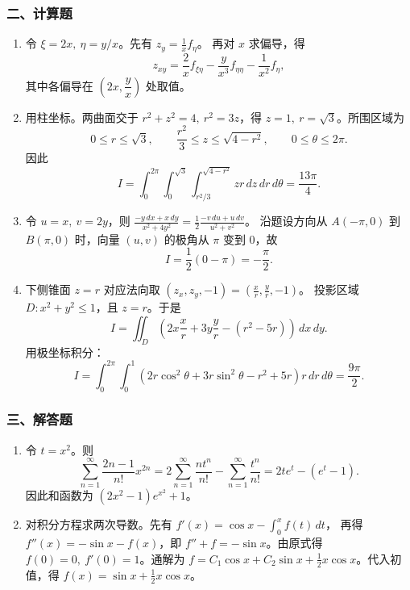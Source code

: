 \subsubsection*{二、计算题}
\begin{enumerate}
  \item 令 $\xi=2x,\ \eta=y/x$。先有 \(\displaystyle z_y=\frac1x f_\eta\)。
  再对 $x$ 求偏导，得
  \[
  z_{xy}=\frac2x f_{\xi\eta}-\frac{y}{x^3}f_{\eta\eta}-\frac1{x^2}f_\eta,
  \]
  其中各偏导在 $\left(2x,\dfrac{y}{x}\right)$ 处取值。
  \item 用柱坐标。两曲面交于 $r^2+z^2=4,\ r^2=3z$，得 $z=1,\ r=\sqrt3$。所围区域为
  \[
  0\le r\le\sqrt3,\qquad \frac{r^2}{3}\le z\le\sqrt{4-r^2},\qquad 0\le\theta\le2\pi .
  \]
  因此
  \[
  I=\int_0^{2\pi}\int_0^{\sqrt3}\int_{r^2/3}^{\sqrt{4-r^2}}z r\,dz\,dr\,d\theta
  =\frac{13\pi}{4}.
  \]
  \item 令 $u=x,\ v=2y$，则 \(\displaystyle \frac{-y\,dx+x\,dy}{x^2+4y^2}=\frac12\frac{-v\,du+u\,dv}{u^2+v^2}\)。
  沿题设方向从 $A(-\pi,0)$ 到 $B(\pi,0)$ 时，向量 $(u,v)$ 的极角从 $\pi$ 变到 $0$，故
  \[
  I=\frac12(0-\pi)=-\frac{\pi}{2}.
  \]
  \item 下侧锥面 $z=r$ 对应法向取 \(\displaystyle (z_x,z_y,-1)=\left(\frac{x}{r},\frac{y}{r},-1\right)\)。
  投影区域 $D:x^2+y^2\le1$，且 $z=r$。于是
  \[
  I=\iint_D\left(2x\frac{x}{r}+3y\frac{y}{r}-(r^2-5r)\right)\,dx\,dy.
  \]
  用极坐标积分：
  \[
  I=\int_0^{2\pi}\int_0^1\left(2r\cos^2\theta+3r\sin^2\theta-r^2+5r\right)r\,dr\,d\theta
  =\frac{9\pi}{2}.
  \]
\end{enumerate}

\subsubsection*{三、解答题}
\begin{enumerate}
  \item 令 $t=x^2$。则
  \[
  \sum_{n=1}^{\infty}\frac{2n-1}{n!}x^{2n}
  =2\sum_{n=1}^{\infty}\frac{n t^n}{n!}-\sum_{n=1}^{\infty}\frac{t^n}{n!}
  =2te^t-(e^t-1).
  \]
  因此和函数为 \(\displaystyle (2x^2-1)e^{x^2}+1\)。
  \item 对积分方程求两次导数。先有 \(\displaystyle f'(x)=\cos x-\int_0^x f(t)\,dt\)，
  再得 \(\displaystyle f''(x)=-\sin x-f(x)\)，即 \(\displaystyle f''+f=-\sin x\)。由原式得 $f(0)=0,\ f'(0)=1$。通解为 \(\displaystyle f=C_1\cos x+C_2\sin x+\frac12 x\cos x\)。代入初值，得 \(\displaystyle f(x)=\sin x+\frac12 x\cos x\)。
\end{enumerate}

